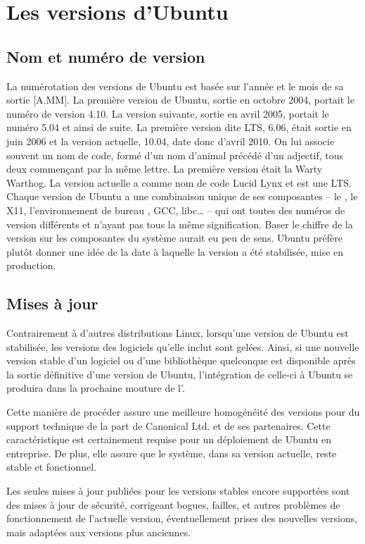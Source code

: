 \section{Les versions d'Ubuntu}
\label{RefVersionUbuntu}
\subsection{Nom et numéro de version}
La numérotation des versions de Ubuntu est basée sur l'année et le mois de sa sortie [A.MM]. La première version de Ubuntu, sortie en octobre 2004, portait le numéro de version 4.10. La version suivante, sortie en avril 2005, portait le numéro 5.04 et ainsi de suite. La première version dite LTS, 6.06, était sortie en juin 2006 et la version actuelle, 10.04, date donc d'avril 2010. On lui associe souvent un nom de code, formé d'un nom d'animal précédé d'un adjectif, tous deux commençant par la même lettre. La première version était la Warty Warthog.
La version actuelle a comme nom de code Lucid Lynx et est une LTS.
Chaque version de Ubuntu a une combinaison unique de ses composantes -- le , le  X11, l'environnement de bureau , GCC, libc\ldots{} -- qui ont toutes des numéros de version différents et n'ayant pas tous la même signification. Baser le chiffre de la version sur les composantes du système aurait eu peu de sens. Ubuntu préfère plutôt donner une idée de la date à laquelle la version a été stabilisée, mise en production.
\subsection{Mises à jour}
Contrairement à d'autres distributions Linux, lorsqu'une version de Ubuntu est stabilisée, les versions des logiciels qu'elle inclut sont gelées. Ainsi, si une nouvelle version stable d'un logiciel ou d'une bibliothèque quelconque est disponible après la sortie définitive d'une version de Ubuntu, l'intégration de celle-ci à Ubuntu se produira dans la prochaine mouture de l'.\par
Cette manière de procéder assure une meilleure homogénéité des versions pour du support technique de la part de Canonical Ltd. et de ses partenaires. Cette caractéristique est certainement requise pour un déploiement de Ubuntu en entreprise. De plus, elle assure que le système, dans sa version actuelle, reste stable et fonctionnel.\par
Les seules mises à jour publiées pour les versions stables encore supportées sont des mises à jour de sécurité, corrigeant bogues, failles, et autres problèmes de fonctionnement de l'actuelle version, éventuellement prises des nouvelles versions, mais adaptées aux versions  plus anciennes.
